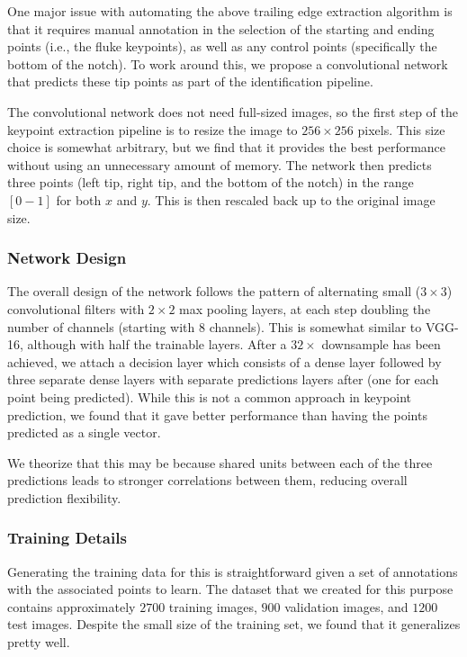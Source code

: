 One major issue with automating the above trailing edge extraction algorithm is that it requires manual annotation in the selection of the starting and ending points (i.e., the fluke keypoints), as well as any control points (specifically the bottom of the notch).
To work around this, we propose a convolutional network that predicts these tip points as part of the identification pipeline.

The convolutional network does not need full-sized images, so the first step of the keypoint extraction pipeline is to resize the image to $256 \times 256$ pixels.
This size choice is somewhat arbitrary, but we find that it provides the best performance without using an unnecessary amount of memory.
The network then predicts three points (left tip, right tip, and the bottom of the notch) in the range $[0-1]$ for both $x$ and $y$. 
This is then rescaled back up to the original image size.

\subsubsection{Network Design}

The overall design of the network follows the pattern of alternating small ($3 \times 3$) convolutional filters with $2 \times 2$ max pooling layers, at each step doubling the number of channels (starting with $8$ channels).
This is somewhat similar to VGG-16, although with half the trainable layers.
After a $32\times$ downsample has been achieved, we attach a decision layer which consists of a dense layer followed by three separate dense layers with separate predictions layers after (one for each point being predicted).
While this is not a common approach in keypoint prediction, we found that it gave better performance than having the points predicted as a single vector.

We theorize that this may be because shared units between each of the three predictions leads to stronger correlations between them, reducing overall prediction flexibility.

\subsubsection{Training Details}

Generating the training data for this is straightforward given a set of annotations with the associated points to learn.
The dataset that we created for this purpose contains approximately $2700$ training images, $900$ validation images, and $1200$ test images.
Despite the small size of the training set, we found that it generalizes pretty well.


